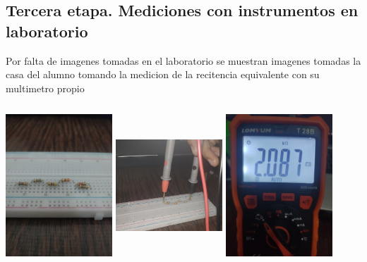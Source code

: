 \documentclass[10pt]{article}
\begin{document}
\begin{multicols}{2}
\section{Tercera etapa. Mediciones con instrumentos en laboratorio}
Por falta de imagenes tomadas en el laboratorio se muestran imagenes tomadas la casa del alumno tomando la medicion de la recitencia equivalente con su multimetro propio 
\begin{center}
	\includegraphics[width=4cm, height=6cm]{Imagenes/Proto.jpeg}
	\includegraphics[width=4cm, height=6cm]{Imagenes/mediciones.jpeg}
	\includegraphics[width=4cm, height=6cm]{Imagenes/muldata.jpeg}
\end{center}


\end{multicols}
\end{document}
